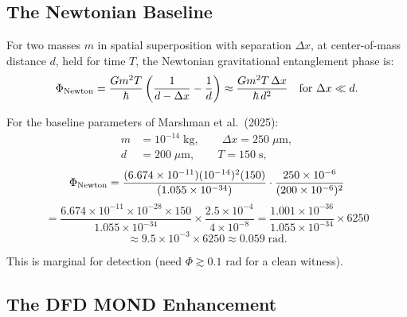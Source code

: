 \documentclass[11pt,a4paper]{article}
\begin{document}
\subsection{The Newtonian Baseline}

For two masses $m$ in spatial superposition with separation $\Delta x$, at center-of-mass distance $d$, held for time $T$, the Newtonian gravitational entanglement phase is:
\begin{equation}\label{eq:Newton-phase}
\Phi_{\rm Newton} = \frac{Gm^2 T}{\hbar}\left(\frac{1}{d - \Delta x} - \frac{1}{d}\right)
\approx \frac{Gm^2 T\,\Delta x}{\hbar\,d^2}\quad\text{for } \Delta x \ll d.
\end{equation}

For the baseline parameters of Marshman et al.\ (2025):
\begin{align}
m &= 10^{-14}\;\text{kg}, \qquad \Delta x = 250\;\mu\text{m}, \\
d &= 200\;\mu\text{m}, \qquad T = 150\;\text{s},
\end{align}
\begin{equation}
\Phi_{\rm Newton} = \frac{(6.674\times 10^{-11})(10^{-14})^2(150)}{(1.055\times 10^{-34})}\cdot\frac{250\times 10^{-6}}{(200\times 10^{-6})^2}
\end{equation}
\begin{equation}
= \frac{6.674\times 10^{-11}\times 10^{-28}\times 150}{1.055\times 10^{-34}}\times\frac{2.5\times 10^{-4}}{4\times 10^{-8}}
= \frac{1.001\times 10^{-36}}{1.055\times 10^{-34}}\times 6250
\end{equation}
\begin{equation}
\approx 9.5\times 10^{-3}\times 6250 \approx 0.059\;\text{rad}.
\end{equation}

This is marginal for detection (need $\Phi \gtrsim 0.1$ rad for a clean witness).

\subsection{The DFD MOND Enhancement}
\end{document}
